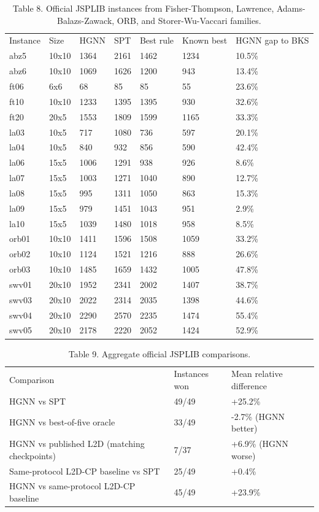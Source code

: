 \documentclass{article}
\begin{document}
\begin{table}[h]
\centering
\begin{tabular}{lllllll}
\toprule
Instance & Size & HGNN & SPT & Best rule & Known best & HGNN gap to BKS \\
abz5 & 10x10 & 1364 & 2161 & 1462 & 1234 & 10.5\% \\
abz6 & 10x10 & 1069 & 1626 & 1200 & 943 & 13.4\% \\
ft06 & 6x6 & 68 & 85 & 85 & 55 & 23.6\% \\
ft10 & 10x10 & 1233 & 1395 & 1395 & 930 & 32.6\% \\
ft20 & 20x5 & 1553 & 1809 & 1599 & 1165 & 33.3\% \\
la03 & 10x5 & 717 & 1080 & 736 & 597 & 20.1\% \\
la04 & 10x5 & 840 & 932 & 856 & 590 & 42.4\% \\
la06 & 15x5 & 1006 & 1291 & 938 & 926 & 8.6\% \\
la07 & 15x5 & 1003 & 1271 & 1040 & 890 & 12.7\% \\
la08 & 15x5 & 995 & 1311 & 1050 & 863 & 15.3\% \\
la09 & 15x5 & 979 & 1451 & 1043 & 951 & 2.9\% \\
la10 & 15x5 & 1039 & 1480 & 1018 & 958 & 8.5\% \\
orb01 & 10x10 & 1411 & 1596 & 1508 & 1059 & 33.2\% \\
orb02 & 10x10 & 1124 & 1521 & 1216 & 888 & 26.6\% \\
orb03 & 10x10 & 1485 & 1659 & 1432 & 1005 & 47.8\% \\
swv01 & 20x10 & 1952 & 2341 & 2002 & 1407 & 38.7\% \\
swv03 & 20x10 & 2022 & 2314 & 2035 & 1398 & 44.6\% \\
swv04 & 20x10 & 2290 & 2570 & 2235 & 1474 & 55.4\% \\
swv05 & 20x10 & 2178 & 2220 & 2052 & 1424 & 52.9\% \\
\bottomrule
\end{tabular}
\caption{Table 8. Official JSPLIB instances from Fisher-Thompson, Lawrence, Adams-Balazs-Zawack, ORB, and Storer-Wu-Vaccari families.}
\end{table}

\begin{table}[h]
\centering
\begin{tabular}{lll}
\toprule
Comparison & Instances won & Mean relative difference \\
HGNN vs SPT & 49/49 & +25.2\% \\
HGNN vs best-of-five oracle & 33/49 & -2.7\% (HGNN better) \\
HGNN vs published L2D (matching checkpoints) & 7/37 & +6.9\% (HGNN worse) \\
Same-protocol L2D-CP baseline vs SPT & 25/49 & +0.4\% \\
HGNN vs same-protocol L2D-CP baseline & 45/49 & +23.9\% \\
\bottomrule
\end{tabular}
\caption{Table 9. Aggregate official JSPLIB comparisons.}
\end{table}
\end{document}
